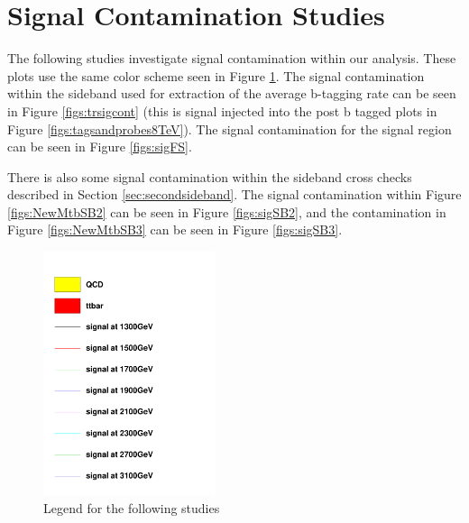 \section{Signal Contamination Studies}
\label{sec:sigcont}
The following studies investigate signal contamination within our analysis.  These plots use the same color scheme seen in Figure \ref{figs:legend}.  
The signal contamination within the sideband used for extraction of the average b-tagging rate can be seen in Figure \ref{figs:trsigcont} (this is signal injected 
into the post b tagged plots in Figure \ref{figs:tagsandprobes8TeV}).  The signal contamination for the signal region can be seen in Figure \ref{figs:sigFS}.

There is also some signal contamination within the sideband cross checks described in Section \ref{sec:secondsideband}.  The signal contamination within Figure \ref{figs:NewMtbSB2} can be seen in Figure \ref{figs:sigSB2}, 
and the contamination in Figure \ref{figs:NewMtbSB3} can be seen in Figure \ref{figs:sigSB3}. 

\begin{figure}[Htcb]
\centering
\includegraphics[width=0.45\textwidth]{figs/legend.pdf}
\caption{Legend for the following studies}
\label{figs:legend}
\end{figure}

